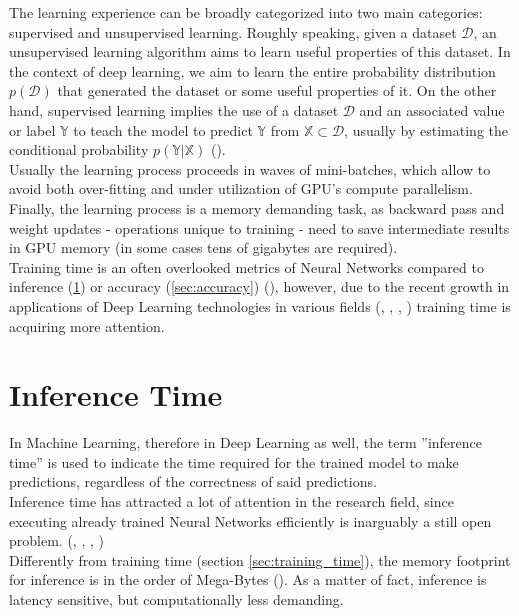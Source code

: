 The learning experience can be broadly categorized into two main categories: supervised and unsupervised learning. Roughly speaking, given a dataset $\mathcal{D}$, an unsupervised learning algorithm aims to learn useful properties of this dataset. In the context of deep learning, we aim to learn the entire probability distribution $p(\mathcal{D})$ that generated the dataset or some useful properties of it. On the other hand, supervised learning implies the use of a dataset $\mathcal{D}$ and an associated value or label $\mathbb{Y}$ to teach the model to predict $\mathbb{Y}$ from $\mathbb{X} \subset \mathcal{D}$, usually by estimating the conditional probability $p(\mathbb{Y} \vert \mathbb{X})$ (\cite{murphy2016overview}).\\
Usually the learning process proceeds in waves of mini-batches, which allow to avoid both over-fitting and under utilization of GPU’s compute parallelism. \cite{8573476}\\
Finally, the learning process is a memory demanding task, as backward pass and weight updates - operations unique to training - need to save intermediate results in GPU memory (in some cases tens of gigabytes are required). \cite{rhu2016vdnn}\\
Training time is an often overlooked metrics of Neural Networks compared to inference (\ref{sec:inference_time_definition}) or accuracy (\ref{sec:accuracy}) (\cite{8573476}), however, due to the recent growth in applications of Deep Learning technologies in various fields (\cite{bojarski2016end}, \cite{huval2015empirical}, \cite{10.1145/2959100}, \cite{amodei2015deep}) training time is acquiring more attention. \cite{8573476}\\

\section{Inference Time}\label{sec:inference_time_definition}
In Machine Learning, therefore in Deep Learning as well, the term ''inference time'' is used to indicate the time required for the trained model to make predictions, regardless of the correctness of said predictions. \\
Inference time has attracted a lot of attention in the research field, since executing already trained Neural Networks efficiently is inarguably a still open problem. (\cite{8573476}, \cite{molchanov2017pruning}, \cite{Duarte_2018}, \cite{7900006})\\
Differently from training time (section \ref{sec:training_time}), the memory footprint for inference is in the order of Mega-Bytes (\cite{han2016eie}). As a matter of fact, inference is latency sensitive, but computationally less demanding. \cite{8573476}\\

